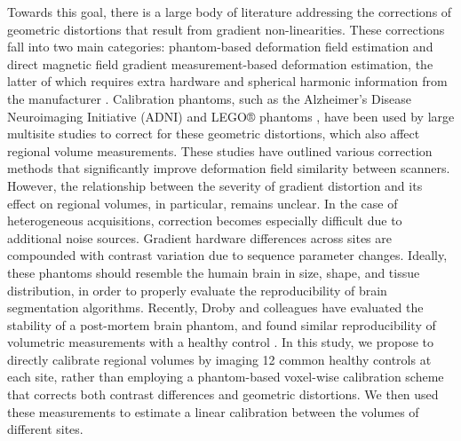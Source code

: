 Towards this goal, there is a large body of literature addressing the corrections of geometric distortions that result from gradient non-linearities. These corrections fall into two main categories: phantom-based deformation field estimation and direct magnetic field gradient measurement-based deformation estimation, the latter of which requires extra hardware and spherical harmonic information from the manufacturer \cite{fonov2010improved}. Calibration phantoms, such as the Alzheimer's Disease Neuroimaging Initiative (ADNI) \cite{gunter2009measurement} and LEGO® phantoms \cite{caramanos2010gradient}, have been used by large multisite studies to correct for these geometric distortions, which also affect regional volume measurements. These studies have outlined various correction methods that significantly improve deformation field similarity between scanners. However, the relationship between the severity of gradient distortion and its effect on regional volumes, in particular, remains unclear. In the case of heterogeneous acquisitions, correction becomes especially difficult due to additional noise sources. Gradient hardware differences across sites are compounded with contrast variation due to sequence parameter changes. Ideally, these phantoms should resemble the humain brain in size, shape, and tissue distribution, in order to properly evaluate the reproducibility of brain segmentation algorithms. Recently, Droby and colleagues have evaluated the stability of a post-mortem brain phantom, and found similar reproducibility of volumetric measurements with a healthy control \cite{droby2015human}. In this study, we propose to directly calibrate regional volumes by imaging 12 common healthy controls at each site, rather than employing a phantom-based voxel-wise calibration scheme that corrects both contrast differences and geometric distortions. We then used these measurements to estimate a linear calibration between the volumes of different sites.
